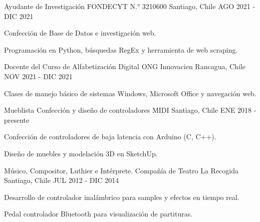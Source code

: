 \begin{cventries}
  \cventry
    {Ayudante de Investigación} %
    {FONDECYT N.° 3210600} %
    {Santiago, Chile} %
    {AGO 2021 - DIC 2021} %
    {
      \begin{cvitems} %
        \item {Confección de Base de Datos e investigación web.}
        \item {Programación en Python, búsquedas RegEx y herramienta de web scraping.}
      \end{cvitems}
    }

  \cventry
    {Docente del Curso de Alfabetización Digital} %
    {ONG Innovacien} %
    {Rancagua, Chile} %
    {NOV 2021 - DIC 2021} %
    {
      \begin{cvitems} %
        \item {Clases de manejo básico de sistemas Windows, Microsoft Office y navegación web.}
      \end{cvitems}
    }

  \cventry
    {Mueblista} %
    {Confección y diseño de controladores MIDI} %
    {Santiago, Chile} %
    {ENE 2018 - presente} %
    {
      \begin{cvitems} %
        \item {Confección de controladores  de baja latencia con Arduino (C, C++).}
        \item {Diseño de muebles y modelación 3D en SketchUp.}
      \end{cvitems}
    }

  \cventry
    {Músico, Compositor, Luthier e Intérprete.}
    {Compañía de Teatro La Recogida}
    {Santiago, Chile}
    {JUL 2012 - DIC 2014}
    {
      \begin{cvitems} %
        \item {Desarrollo de controlador  inalámbrico para samples y efectos en tiempo real.}
        \item {Pedal controlador Bluetooth para visualización de partituras.}
      \end{cvitems}
    }   


\end{cventries}
